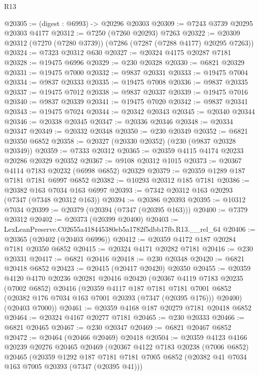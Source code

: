 \begin{lexlean}{R13}
\begin{coremodule}
@20305 := (digest : @6993) -> @20296 @20303
@20309 := @7243 @3739 @20295 @20303 @4177
@20312 := @7250 (@7260 @20293) @7263
@20322 := @20309 @20312 (@7270 (@7280 @3739)) (@7286 (@7287 (@7288 @4177) @20295 @7263))
@20324 := @7323 @20312 @630
@20327 := @20324 @4175 @20287 @7181
@20328 := @19475 @6996
@20329 := @230 @20328
@20330 := @6821 @20329
@20331 := @19475 @7000
@20332 := @9837 @20331
@20333 := @19475 @7004
@20334 := @9837 @20333
@20335 := @19475 @7008
@20336 := @9837 @20335
@20337 := @19475 @7012
@20338 := @9837 @20337
@20339 := @19475 @7016
@20340 := @9837 @20339
@20341 := @19475 @7020
@20342 := @9837 @20341
@20343 := @19475 @7024
@20344 := @20342 @20343
@20345 := @20340 @20344
@20346 := @20338 @20345
@20347 := @20336 @20346
@20348 := @20334 @20347
@20349 := @20332 @20348
@20350 := @230 @20349
@20352 := @6821 @20350 @6852
@20358 := @20327 (@20330 @20352) (@230 (@9837 @20328 @20349))
@20359 := @7333 @20312
@20365 := @20359 @4115 @4174 @20233 @20286 @20329 @20352
@20367 := @9108 @20312 @1015
@20373 := @20367 @4114 @7183 @20232 (@6998 @6852) @20329
@20379 := @20359 @1289 @187 @7181 @7181 @6997 @6852
@20382 := @10293 @20312 @185 @7181
@20386 := @20382 @163 @7034 @163 @6997
@20393 := @7342 @20312 @163 @20293 (@7347 (@7348 @20312 @163))
@20394 := @20386 @20393
@20395 := @10312 @7034
@20399 := @20379 (@20394 (@7347 (@20395 @163)))
@20400 := @7379 @20312
@20402 := @20373 (@20399 @20400)
@20403 := LexLeanPreserve.C02655a418445380eb5a1782f5dbb17fb.R13.__rel_64
@20406 := @20365 (@20402 (@20403 @6996))
@20412 := @20359 @4172 @187 @20284 @7181 @20350 @6852
@20415 := @20324 @4171 @20282 @7181
@20416 := @230 @20331
@20417 := @6821 @20416
@20418 := @230 @20348
@20420 := @6821 @20418 @6852
@20423 := @20415 (@20417 @20420) @20350
@20455 := @20359
    @4120
    @4170
    @20236
    @20281
    @20416
    @20420
    (@20367
      @4119
      @7183
      @20235
      (@7002 @6852)
      @20416
      (@20359
        @4117
        @187
        @7181
        @7181
        @7001
        @6852
        (@20382 @176 @7034 @163 @7001 @20393 (@7347 (@20395 @176)))
        @20400)
      (@20403 @7000))
@20461 := @20359 @4168 @187 @20279 @7181 @20418 @6852
@20464 := @20324 @4167 @20277 @7181
@20465 := @230 @20333
@20466 := @6821 @20465
@20467 := @230 @20347
@20469 := @6821 @20467 @6852
@20472 := @20464 (@20466 @20469) @20418
@20504 := @20359
    @4123
    @4166
    @20239
    @20276
    @20465
    @20469
    (@20367
      @4122
      @7183
      @20238
      (@7006 @6852)
      @20465
      (@20359
        @1292
        @187
        @7181
        @7181
        @7005
        @6852
        (@20382 @41 @7034 @163 @7005 @20393 (@7347 (@20395 @41)))

\end{coremodule}
\end{lexlean}
